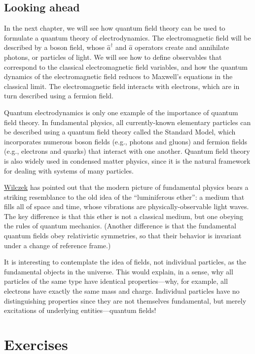 \documentclass[prx,12pt]{revtex4-2}
\begin{document}
\subsection{Looking ahead}
\label{sec:outlook}

In the next chapter, we will see how quantum field theory can be used
to formulate a quantum theory of electrodynamics.  The electromagnetic
field will be described by a boson field, whose $\hat{a}^\dagger$ and
$\hat{a}$ operators create and annihilate photons, or particles of
light.  We will see how to define observables that correspond to the
classical electromagnetic field variables, and how the quantum
dynamics of the electromagnetic field reduces to Maxwell's equations
in the classical limit.  The electromagnetic field interacts with
electrons, which are in turn described using a fermion field.

Quantum electrodynamics is only one example of the importance of
quantum field theory.  In fundamental physics, all currently-known
elementary particles can be described using a quantum field theory
called the Standard Model, which incorporates numerous boson fields
(e.g., photons and gluons) and fermion fields (e.g., electrons and
quarks) that interact with one another.  Quantum field theory is also
widely used in condensed matter physics, since it is the natural
framework for dealing with systems of many particles.

\hyperref[cite:wilczek]{Wilczek} has pointed out that the modern
picture of fundamental physics bears a striking resemblance to the old
idea of the ``luminiferous ether'': a medium that fills all of space
and time, whose vibrations are physically-observable light waves.  The
key difference is that this ether is not a classical medium, but one
obeying the rules of quantum mechanics.  (Another difference is that
the fundamental quantum fields obey relativistic symmetries, so that
their behavior is invariant under a change of reference frame.)

It is interesting to contemplate the idea of fields, not individual
particles, as the fundamental objects in the universe.  This would
explain, in a sense, why all particles of the same type have identical
properties---why, for example, all electrons have exactly the same
mass and charge.  Individual particles have no distinguishing
properties since they are not themselves fundamental, but merely
excitations of underlying entities---quantum fields!

\section*{Exercises}
\end{document}
